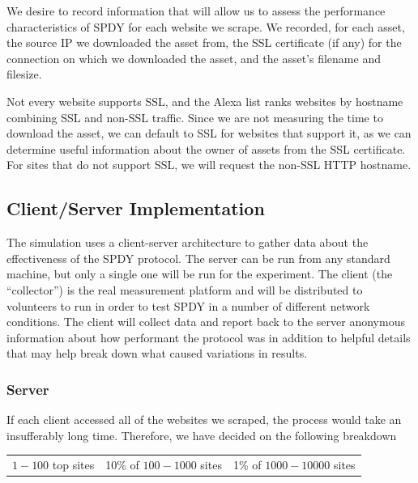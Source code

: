 \documentclass[11pt,letterpaper,notitlepage]{article}
\begin{document}
We desire to record information that will allow us to assess the performance
characteristics of SPDY for each website we scrape. We recorded, for each
asset, the source IP we downloaded the asset from, the SSL certificate (if any)
for the connection on which we downloaded the asset, and the asset's filename
and filesize.

Not every website supports SSL, and the Alexa list ranks websites by hostname
combining SSL and non-SSL traffic. Since we are not measuring the time to
download the asset, we can default to SSL for websites that support it, as we
can determine useful information about the owner of assets from the SSL
certificate. For sites that do not support SSL, we will request the non-SSL
HTTP hostname.

\subsection{Client/Server Implementation}
\label{sec:research/client-server}
The simulation uses a client-server architecture to gather data about the
effectiveness of the SPDY protocol. The server can be run from any standard
machine, but only a single one will be run for the experiment.  The client (the
``collector'') is the real measurement platform and will be distributed to
volunteers to run in order to test SPDY in a number of different network
conditions.  The client will collect data and report back to the server
anonymous information about how performant the protocol was in addition to
helpful details that may help break down what caused variations in results.
\subsubsection{Server}
\label{sec:research/server}
If each client accessed all of the websites we scraped, the process would take
an insufferably long time.  Therefore, we have decided on the following
breakdown
\begin{center}
\begin{tabular}{ccc}
$1-100$ top sites & 10\% of $100-1000$ sites & 1\% of $1000-10000$ sites \\
\end{tabular}
\end{center}
\end{document}
